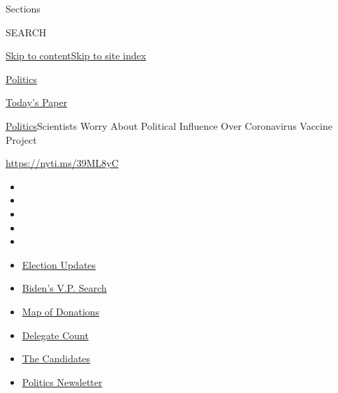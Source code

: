 Sections

SEARCH

\protect\hyperlink{site-content}{Skip to
content}\protect\hyperlink{site-index}{Skip to site index}

\href{https://www.nytimes3xbfgragh.onion/section/politics}{Politics}

\href{https://myaccount.nytimes3xbfgragh.onion/auth/login?response_type=cookie\&client_id=vi}{}

\href{https://www.nytimes3xbfgragh.onion/section/todayspaper}{Today's
Paper}

\href{/section/politics}{Politics}\textbar{}Scientists Worry About
Political Influence Over Coronavirus Vaccine Project

\url{https://nyti.ms/39ML8yC}

\begin{itemize}
\item
\item
\item
\item
\item
\end{itemize}

\begin{itemize}
\item
  \href{https://www.nytimes3xbfgragh.onion/2020/07/31/us/elections/biden-vs-trump.html?action=click\&pgtype=Article\&state=default\&region=TOP_BANNER\&context=storylines_menu}{Election
  Updates}
\item
  \href{https://www.nytimes3xbfgragh.onion/article/biden-vice-president-2020.html?action=click\&pgtype=Article\&state=default\&region=TOP_BANNER\&context=storylines_menu}{Biden's
  V.P. Search}
\item
  \href{https://www.nytimes3xbfgragh.onion/interactive/2020/07/24/us/politics/trump-biden-campaign-donors.html?action=click\&pgtype=Article\&state=default\&region=TOP_BANNER\&context=storylines_menu}{Map
  of Donations}
\item
  \href{https://www.nytimes3xbfgragh.onion/interactive/2020/us/elections/delegate-count-primary-results.html?action=click\&pgtype=Article\&state=default\&region=TOP_BANNER\&context=storylines_menu}{Delegate
  Count}
\item
  \href{https://www.nytimes3xbfgragh.onion/interactive/2019/us/politics/2020-presidential-candidates.html?action=click\&pgtype=Article\&state=default\&region=TOP_BANNER\&context=storylines_menu}{The
  Candidates}
\item
  \href{https://www.nytimes3xbfgragh.onion/newsletters/politics?action=click\&pgtype=Article\&state=default\&region=TOP_BANNER\&context=storylines_menu}{Politics
  Newsletter}
\end{itemize}

